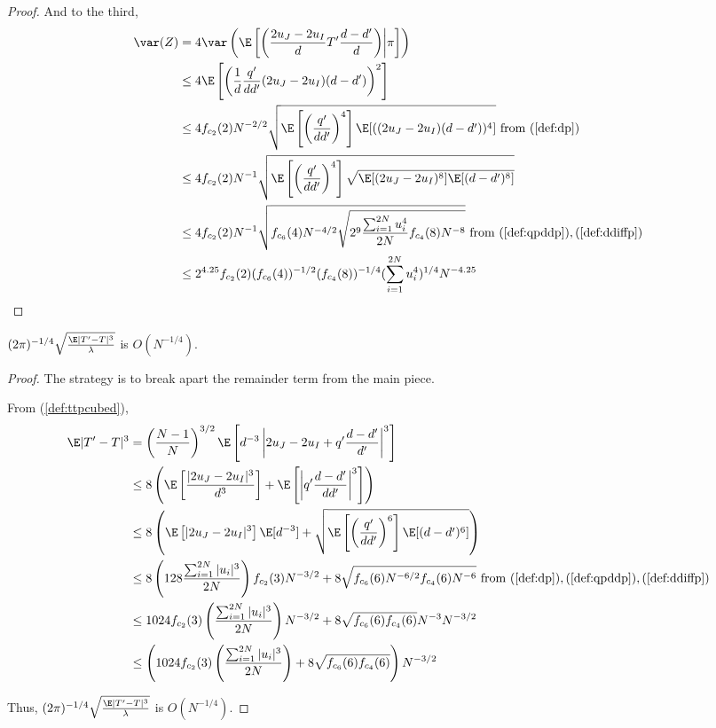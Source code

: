\begin{proof}
  And to the third,
  \begin{align*}
    \var(Z) &= 4 \var \left ( \E \left [ \left ( \frac{2u_J-2u_I}{d}
          T'\frac{d-d'}{d} \right ) \middle | \pi \right ] \right ) \\
    &\leq 4 \E \left [ \left ( \frac{1}{d} \frac{q'}{dd'}
        (2u_J-2u_I)(d-d') \right )^2 \right ] \\
    &\leq 4 f_{c_2}(2) N^{-2/2} \sqrt{\E \left [ \left (
          \frac{q'}{dd'} \right )^4 \right ] \E[((2u_J-2u_I)(d-d'))^4]
    } \text{ from } (\ref{def:dp}) \\
    &\leq 4 f_{c_2}(2) N^{-1} \sqrt{\E \left [ \left (
          \frac{q'}{dd'} \right )^4 \right ] \sqrt{\E[(2u_J-2u_I)^8]
      \E[(d-d')^8]}} \\
    &\leq 4 f_{c_2}(2) N^{-1} \sqrt{f_{c_6}(4) N^{-4/2} \sqrt{2^9
        \frac{\sum_{i=1}^{2N}u_i^4}{2N} f_{c_4}(8) N^{-8}}}
    \text{ from } (\ref{def:qpddp}),(\ref{def:ddiffp}) \\
    &\leq 2^{4.25}f_{c_2}(2) (f_{c_6}(4))^{-1/2} (f_{c_4}(8))^{-1/4}
    (\sum_{i=1}^{2N}u_i^4)^{1/4} N^{-4.25}
  \end{align*}
\end{proof}

\begin{proposition}
  $(2\pi)^{-1/4}\sqrt{\frac{\E|T'-T|^3}{\lambda}}$ is
  $O(N^{-1/4})$.
\end{proposition}
\begin{proof}
  The strategy is to break apart the remainder term from the main piece.  

  From (\ref{def:ttpcubed}),
  \begin{align*}
    \E|T'-T|^3 
    &= \left (\frac{N-1}{N}\right )^{3/2}
    \E \left [d^{-3} \left |2u_J-2u_I+q'\frac{d-d'}{d'} \right |^3
    \right ] \\
    &\leq 8 \left (
      \E \left [ \frac{|2u_J-2u_I|^3}{d^3} \right ] + 
      \E \left [ \left | q'\frac{d-d'}{dd'} \right |^3
      \right ] \right ) \\
    &\leq 8 \left (
      \E \left [ |2u_J-2u_I|^3 \right ] \E [d^{-3}] + 
      \sqrt{\E \left [ \left ( \frac{q'}{dd'} \right )^6 \right ]  \E
        [(d-d')^6]} \right ) \\
    &\leq 8 \left ( 128 \frac{\sum_{i=1}^{2N} |u_i|^3}{2N} \right )
    f_{c_2}(3) N^{-3/2} + 
    8 \sqrt{f_{c_6}(6) N^{-6/2} f_{c_4}(6) N^{-6}} \text{ from } 
    (\ref{def:dp}),(\ref{def:qpddp}),(\ref{def:ddiffp}) \\
    &\leq 1024 f_{c_2}(3) \left ( \frac{\sum_{i=1}^{2N} |u_i|^3}{2N}
    \right ) N^{-3/2} + 8 \sqrt{f_{c_6}(6)f_{c_4}(6)} N^{-3} N^{-3/2} \\
    &\leq \left ( 1024 f_{c_2}(3) \left ( \frac{\sum_{i=1}^{2N} |u_i|^3}{2N}
    \right ) + 8 \sqrt{f_{c_6}(6)f_{c_4}(6)} \right ) N^{-3/2}
  \end{align*}

  Thus, $(2\pi)^{-1/4}\sqrt{\frac{\E|T'-T|^3}{\lambda}}$ is $O(N^{-1/4})$.
\end{proof}

